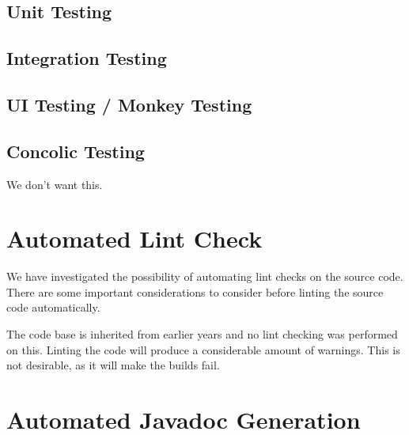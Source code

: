 \subsection{Unit Testing}
\subsection{Integration Testing}
\subsection{UI Testing / Monkey Testing}
\subsection{Concolic Testing}
We don't want this.

\section{Automated Lint Check}
We have investigated the possibility of automating lint checks on the source code. There are some important considerations to consider before linting the source code automatically.


The code base is inherited from earlier years and no lint checking was performed on this. Linting the code will produce a considerable amount of warnings. This is not desirable, as it will make the builds fail.



\section{Automated Javadoc Generation}
